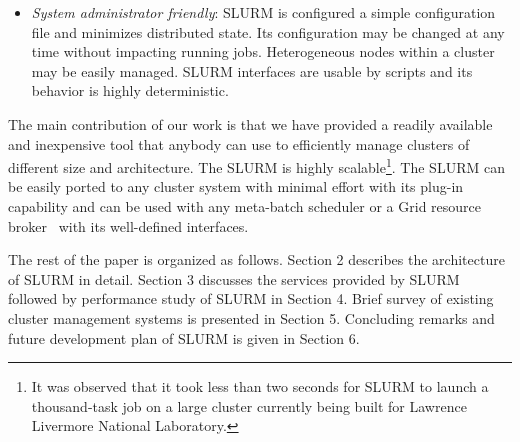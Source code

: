\begin{itemize}
\item {\em System administrator friendly}: SLURM is configured a 
simple configuration file and minimizes distributed state.  
Its configuration may be changed at any time without impacting running jobs. 
Heterogeneous nodes within a cluster may be easily managed.
SLURM interfaces are usable by scripts and its behavior is highly 
deterministic.

\end{itemize}

The main contribution of our work is that we have provided a readily available 
and inexpensive tool that anybody can use to efficiently manage clusters of different size and architecture. 
The SLURM is highly scalable\footnote{It was observed that it took less than two seconds for SLURM to launch a thousand-task job on 
a large cluster currently being built for Lawrence Livermore National Laboratory.}. 
The SLURM can be easily ported to any cluster system with minimal effort with its plug-in 
capability and can be used with any meta-batch scheduler or a Grid resource broker~\cite{Gridbook}
with its well-defined interfaces.

The rest of the paper is organized as follows. 
Section 2 describes the architecture of SLURM in detail. Section 3 discusses the services provided by SLURM followed by performance study of 
SLURM in Section 4. Brief survey of existing cluster management systems is presented in Section 5. 
Concluding remarks and future development plan of SLURM is given in Section 6.
